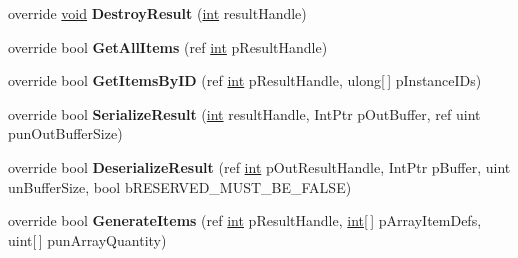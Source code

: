 \begin{DoxyCompactItemize}
\item 
\hypertarget{classValve_1_1Steamworks_1_1CSteamInventory_ab173ea3af695a4e57548e035e9ff10dc}{}override \hyperlink{SDL__audio_8h_a52835ae37c4bb905b903cbaf5d04b05f}{void} {\bfseries Destroy\+Result} (\hyperlink{SDL__thread_8h_a6a64f9be4433e4de6e2f2f548cf3c08e}{int} result\+Handle)\label{classValve_1_1Steamworks_1_1CSteamInventory_ab173ea3af695a4e57548e035e9ff10dc}

\item 
\hypertarget{classValve_1_1Steamworks_1_1CSteamInventory_a380c6687b561e9e61b4a570870f047d7}{}override bool {\bfseries Get\+All\+Items} (ref \hyperlink{SDL__thread_8h_a6a64f9be4433e4de6e2f2f548cf3c08e}{int} p\+Result\+Handle)\label{classValve_1_1Steamworks_1_1CSteamInventory_a380c6687b561e9e61b4a570870f047d7}

\item 
\hypertarget{classValve_1_1Steamworks_1_1CSteamInventory_ac8d6099afe5e5b0aa9cea0bdb6f9276f}{}override bool {\bfseries Get\+Items\+By\+I\+D} (ref \hyperlink{SDL__thread_8h_a6a64f9be4433e4de6e2f2f548cf3c08e}{int} p\+Result\+Handle, ulong\mbox{[}$\,$\mbox{]} p\+Instance\+I\+Ds)\label{classValve_1_1Steamworks_1_1CSteamInventory_ac8d6099afe5e5b0aa9cea0bdb6f9276f}

\item 
\hypertarget{classValve_1_1Steamworks_1_1CSteamInventory_a4693d0ba64e65fad7049b86c18200d29}{}override bool {\bfseries Serialize\+Result} (\hyperlink{SDL__thread_8h_a6a64f9be4433e4de6e2f2f548cf3c08e}{int} result\+Handle, Int\+Ptr p\+Out\+Buffer, ref uint pun\+Out\+Buffer\+Size)\label{classValve_1_1Steamworks_1_1CSteamInventory_a4693d0ba64e65fad7049b86c18200d29}

\item 
\hypertarget{classValve_1_1Steamworks_1_1CSteamInventory_a0e8c9b0a27bac838d77d832f6a8dd728}{}override bool {\bfseries Deserialize\+Result} (ref \hyperlink{SDL__thread_8h_a6a64f9be4433e4de6e2f2f548cf3c08e}{int} p\+Out\+Result\+Handle, Int\+Ptr p\+Buffer, uint un\+Buffer\+Size, bool b\+R\+E\+S\+E\+R\+V\+E\+D\+\_\+\+M\+U\+S\+T\+\_\+\+B\+E\+\_\+\+F\+A\+L\+S\+E)\label{classValve_1_1Steamworks_1_1CSteamInventory_a0e8c9b0a27bac838d77d832f6a8dd728}

\item 
\hypertarget{classValve_1_1Steamworks_1_1CSteamInventory_a4758d443c50fd5a2d68621bb6c209126}{}override bool {\bfseries Generate\+Items} (ref \hyperlink{SDL__thread_8h_a6a64f9be4433e4de6e2f2f548cf3c08e}{int} p\+Result\+Handle, \hyperlink{SDL__thread_8h_a6a64f9be4433e4de6e2f2f548cf3c08e}{int}\mbox{[}$\,$\mbox{]} p\+Array\+Item\+Defs, uint\mbox{[}$\,$\mbox{]} pun\+Array\+Quantity)\label{classValve_1_1Steamworks_1_1CSteamInventory_a4758d443c50fd5a2d68621bb6c209126}


\end{DoxyCompactItemize}
